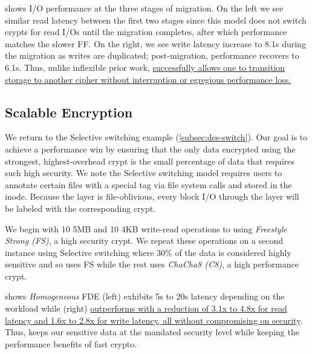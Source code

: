 

 shows I/O performance at the three stages of
migration. On the left we see similar read latency between the first two stages
since this model does not switch crypts for read I/Os until the migration
completes, after which performance matches the slower FF. On the right, we see
write latency increase to 8.1s during the migration as writes are duplicated;
post-migration, performance recovers to 6.1s. Thus, unlike inflexible prior
work, \sys \uline{successfully allows one to transition storage to another
cipher without interruption or egregious performance loss.}


\subsection{Scalable Encryption}\label{subsec:usecase-scalable}

We return to the Selective switching example
(\cref{subsec:des-switch}). Our goal is to achieve a performance win by ensuring
that the only data encrypted using the strongest, highest-overhead crypt is the
small percentage of data that requires such high security. We note the Selective
switching model requires users to annotate certain files with a special tag via
file system calls and stored in the inode. Because the \sys layer is
file-oblivious, every block I/O through the \sys layer will be labeled with the
corresponding crypt.

We begin with 10 5MB and 10 4KB write-read operations to \sys using {\em
Freestyle Strong (FS)}, a high security crypt. We repeat these operations on a
second instance using Selective switching where 30\% of the data is considered
highly sensitive and so uses FS while the rest uses {\em ChaCha8 (C8)}, a high
performance crypt.



 shows {\em Homogeneous} FDE (left) exhibits 5s to
20s latency depending on the workload while \sys (right) \uline{outperforms with
a reduction of 3.1x to 4.8x for read latency and 1.6x to 2.8x for write latency,
all without compromising on security}. Thus, \sys keeps our sensitive data at
the mandated security level while keeping the performance benefits of fast
crypto.
